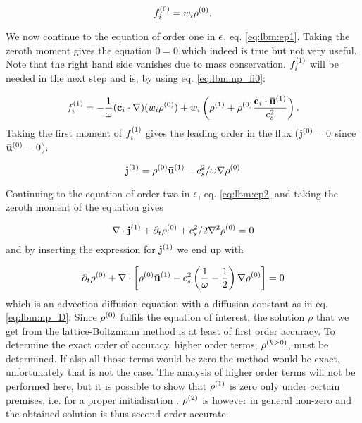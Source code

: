 \begin{equation}\label{eq:lbm:np_fi0}
f_i^{(0)} = w_i\rho^{(0)}.
\end{equation}

We now continue to the equation of order one in $\epsilon$,
eq. \eqref{eq:lbm:ep1}. Taking the zeroth moment gives the equation $0
= 0$ which indeed is true but not very useful. Note that the right
hand side vanishes due to mass conservation. $f_i^{(1)}$ will be needed
in the next step and is, by using eq. \eqref{eq:lbm:np_fi0}:

\begin{equation}
f_i^{(1)} = -\frac{1}{\omega} (\mathbf{c}_i\cdot\nabla)(w_i\rho^{(0)}) + w_i\left( \rho^{(1)} +
\rho^{(0)} \frac{\mathbf{c}_i \cdot \mathbf{\bar{u}}^{(1)} }{c_s^2} \right).
\end{equation}
Taking the first moment of $f_i^{(1)}$ gives the leading order in the
flux ($\mathbf{j}^{(0)} = 0$ since $\mathbf{\bar{u}}^{(0)} = 0$):

\begin{equation}
\mathbf{j}^{(1)} = \rho^{(0)}\mathbf{\bar{u}}^{(1)} - c_s^2/\omega\nabla\rho^{(0)}
\end{equation} 

Continuing to the equation of order two in $\epsilon$,
eq. \eqref{eq:lbm:ep2} and taking the zeroth moment of the equation
gives

\begin{equation}
\nabla \cdot \mathbf{j}^{(1)} + \partial_t \rho^{(0)} + c_s^2/2\nabla^2 \rho^{(0)} = 0
\end{equation}
and by inserting the expression for $\mathbf{j}^{(1)}$ we end up with

\begin{equation}
\partial_t \rho^{(0)} + \nabla \cdot \left [ \rho^{(0)}\mathbf{\bar{u}}^{(1)} - c_s^2
  \left( \frac{1}{\omega} - \frac{1}{2} \right)\nabla\rho^{(0)} \right ]
= 0
\end{equation}
which is an advection diffusion equation with a diffusion constant as
in eq. \eqref{eq:lbm:np_D}. Since $\rho^{(0)}$ fulfils the equation of
interest, the solution $\rho$ that we get from the lattice-Boltzmann
method is at least of first order accuracy. To determine the exact
order of accuracy, higher order terms, $\rho^{(k > 0)}$, must be
determined. If also all those terms would be zero the method would be
exact, unfortunately that is not the case. The analysis of higher order
terms will not be performed here, but it is possible to show that
$\rho^{(1)}$ is zero only under certain premises, i.e. for a proper
initialisation \cite{alexey-tobias}. $\rho^{(2)}$ is however in general
non-zero and the obtained solution is thus second order accurate.  
